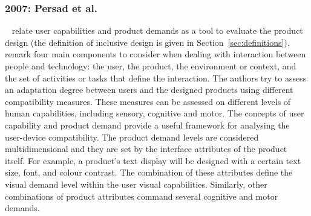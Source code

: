 
\subsubsection{2007: Persad et al.}
\label{sec:persad}

\citet{persad_characterising_2007}~\citep{persad_cognitive_2007} relate user
capabilities and product demands as a tool to evaluate the product design (the
definition of inclusive design is given in Section~\ref{sec:definitions}).
\citeauthor{persad_characterising_2007} remark four main components to consider 
when dealing with interaction between people and technology: the user, the 
product, the environment or context, and the set of activities or tasks 
that define the interaction. The authors try to assess an adaptation degree 
between users and the designed products using different compatibility measures. 
These measures can be assessed on different levels of human capabilities, 
including sensory, cognitive and motor. The concepts of user capability and 
product demand provide a useful framework for analysing the user-device 
compatibility. The product demand levels are considered multidimensional and 
they are set by the interface attributes of the product itself. For example, 
a product's text display will be designed with a certain text size, font, and 
colour contrast. The combination of these attributes define the visual demand 
level within the user visual capabilities. Similarly, other combinations of 
product attributes command several cognitive and motor demands. 

